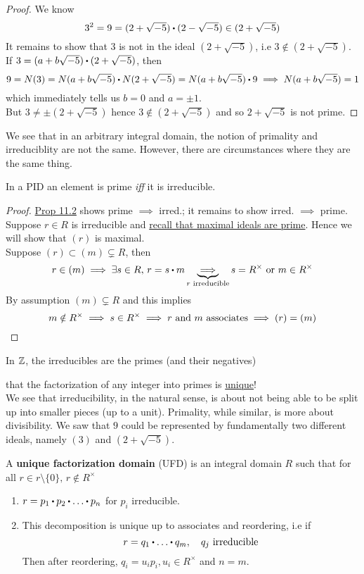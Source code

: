 \documentclass[../Main.tex]{subfiles}
\begin{document}
\begin{proof}
	We know
	\[3^2=9=(2+\sqrt{-5})\rdot (2-\sqrt{-5}) \in (2+\sqrt{-5})\]
	It remains to show that $3$ is not in the ideal $(2+\sqrt{-5})$, i.e $3\notin (2+\sqrt{-5})$.
	If ${3=(a+b\sqrt{-5})\rdot (2+\sqrt{-5})}$, then 
	\[9=N(3)=N(a+b\sqrt{-5})\rdot N(2+\sqrt{-5}) =N(a+b\sqrt{-5})\rdot 9 \implies N(a+b\sqrt{-5}) =1 \]
	which immediately tells us $b=0$ and $a=\pm 1$.\\
	But $3\ne \pm  (2+\sqrt{-5})$ hence $3\notin (2+\sqrt{-5})$ and so $2+\sqrt{-5}$ is not prime.
\end{proof}
We see that in an arbitrary integral domain, the notion of primality and irreduciblity are not the same. However, there are circumstances where they are the same thing.
\begin{prop}[title = Element in PID is prime iff it is irreducible]
	In a PID an element is prime \textit{iff} it is irreducible.
\end{prop}
\begin{proof}
	\hyperref[prop:11.2]{Prop 11.2} shows prime $\implies$ irred.; it remains to show irred. $\implies$ prime.\\
	Suppose $r\in R$ is irreducible and \hyperref[co:7.9]{recall that maximal ideals are prime}. Hence we will show that $(r)$ is maximal.\\
	Suppose $(r)\subset (m)\subsetneq R$, then
	\[r\in (m) \implies \exists s\in R,\, r=s\rdot m \underbrace{\implies}_{r \text{ irreducible} } s=R^\times \text{ or } m\in R^\times\]
	By assumption $(m)\subsetneq R$ and this implies
	\[m\notin R^\times \implies s\in R^\times \implies r \text{ and } m \text{ associates} \implies (r) = (m)\qedhere\]
\end{proof}
\begin{example}
	In $\mathbb{Z}$, the irreducibles are the primes (and their negatives)
\end{example}
\Obs that the factorization of any integer into primes is \underline{unique}!\\
We see that irreducibility, in the natural sense, is about not being able to be split up into smaller pieces (up to a unit). Primality, while similar, is more about divisibility. We saw that $9$ could be represented by fundamentally two different ideals, namely $(3)$ and $(2+\sqrt{-5})$.
\begin{dfn}[title = Unique Factorization Domain]
	A \textbf{unique factorization domain} (UFD) is an integral domain $R$ such that for all $r\in r\setminus \{0\},\, r\notin R^\times$
	\begin{enumerate}
		\item $r=p_1\rdot p_2\rdot \dots\rdot p_n$ for $p_i$ irreducible.
		\item This decomposition is unique up to associates and reordering, i.e if 
		\[r=q_1\rdot \dots \rdot q_m,\quad q_j \text{ irreducible}\]
		Then after reordering, $q_i=u_ip_i, u_i\in R^\times$ and $n=m$.
	\end{enumerate}
\end{dfn}
\end{document}
